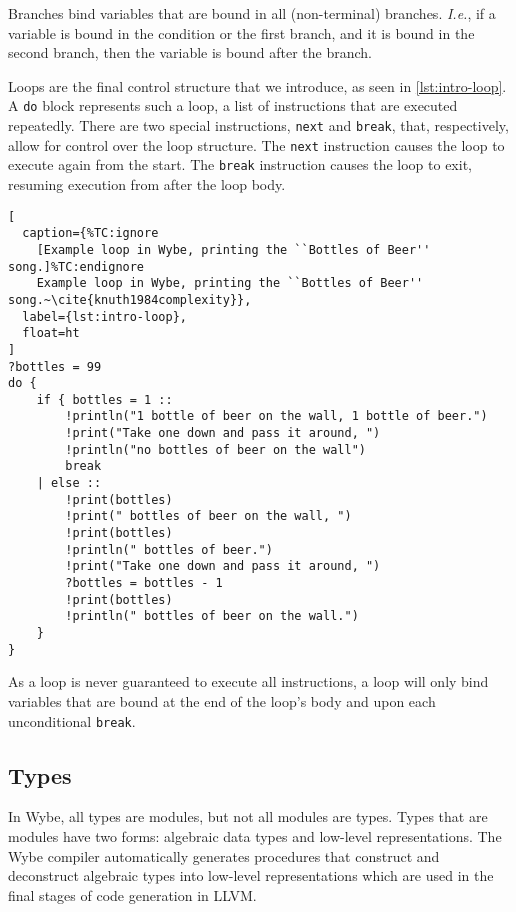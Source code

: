 Branches bind variables that are bound in all (non-terminal) branches. \textit{I.e.}, if a variable is bound in the condition or the first branch, and it is bound in the second branch, then the variable is bound after the branch.

Loops are the final control structure that we introduce, as seen in \cref{lst:intro-loop}. A \texttt{do} block represents such a loop, a list of instructions that are executed repeatedly. There are two special instructions, \texttt{next} and \texttt{break}, that, respectively, allow for control over the loop structure. The \texttt{next} instruction causes the loop to execute again from the start. The \texttt{break} instruction causes the loop to exit, resuming execution from after the loop body.

\begin{lstlisting}[
  caption={%TC:ignore
    [Example loop in Wybe, printing the ``Bottles of Beer'' song.]%TC:endignore
    Example loop in Wybe, printing the ``Bottles of Beer'' song.~\cite{knuth1984complexity}},
  label={lst:intro-loop},
  float=ht
]
?bottles = 99
do {
    if { bottles = 1 :: 
        !println("1 bottle of beer on the wall, 1 bottle of beer.")
        !print("Take one down and pass it around, ")
        !println("no bottles of beer on the wall")
        break
    | else :: 
        !print(bottles)
        !print(" bottles of beer on the wall, ")
        !print(bottles)
        !println(" bottles of beer.")
        !print("Take one down and pass it around, ")
        ?bottles = bottles - 1 
        !print(bottles)
        !println(" bottles of beer on the wall.")
    }
}
\end{lstlisting}

As a loop is never guaranteed to execute all instructions, a loop will only bind variables that are bound at the end of the loop's body and upon each unconditional \texttt{break}.

\subsection{Types}
\label{ssec:intro-types}

In Wybe, all types are modules, but not all modules are types. Types that are modules have two forms: algebraic data types and low-level representations. The Wybe compiler automatically generates procedures that construct and deconstruct algebraic types into low-level representations which are used in the final stages of code generation in LLVM.

